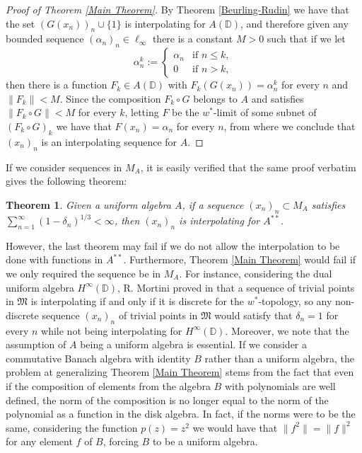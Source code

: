 \documentclass[preprint,12pt,number]{elsarticle}
\newtheorem{theorem}{Theorem}[section]
\newcommand{\D}{\mathbb{D}}
\begin{document}
\begin{proof}[Proof of Theorem \ref{Main Theorem}]
    By Theorem \ref{Beurling-Rudin} we have that the set $(G(x_n))_n\cup \{1\}$ is interpolating for $A(\D)$, and therefore given any bounded sequence $(\alpha_n)_n\in \ell_\infty$ there is a constant $M>0$ such that if we let 
    \[
    \alpha_n^k:=\left\{\begin{array}{cc}
       \alpha_n  & \text{if } n\leq k, \\
       0  & \text{if } n> k,
    \end{array}\right.
    \] 
    then there is a function $F_k\in A(\D)$ with $F_k(G(x_n))=\alpha_n^k$ for every $n$ and $\lVert F_k \rVert<M$. Since the composition $F_k\circ G$ belongs to $A$ and satisfies $\lVert F_k\circ G \rVert<M$ for every $k$, letting $F$ be the $w^*$-limit of some subnet of $(F_k\circ G)_k$ we have that $F(x_n)=\alpha_n$ for every $n$, from where we conclude that $(x_n)_n$ is an interpolating sequence for $A$.

\end{proof}



If we consider sequences in $M_A$, it is easily verified that the same proof verbatim gives the following theorem:
\begin{theorem}\label{Main-teo-bidual}
    Given a uniform algebra $A$, if a sequence $(x_n)_n\subset M_A$ satisfies $\sum_{n=1}^\infty(1-\delta_n)^{1/3}<\infty$, then $(x_n)_n$ is interpolating for $A^{**}$.
\end{theorem}

However, the last theorem may fail if we do not allow the interpolation to be done with functions in $A^{**}$. Furthermore, Theorem \ref{Main Theorem} would fail if we only required the sequence be in $M_A$. For instance, considering the dual uniform algebra $H^\infty(\D)$, R. Mortini proved in \cite{Mortini2000} that a sequence of trivial points in $\mathfrak{M}$ is interpolating if and only if it is discrete for the $w^*$-topology, so any non-discrete sequence $(x_n)_n$ of trivial points in $\mathfrak{M}$ would satisfy that $\delta_n=1$ for every $n$ while not being interpolating for $H^\infty(\D)$. Moreover,  we note that the assumption of $A$ being a uniform algebra is essential. If we consider a commutative Banach algebra with identity $B$ rather than a uniform algebra, the problem at generalizing Theorem \ref{Main Theorem} stems from the fact that even if the composition of elements from the algebra $B$ with polynomials are well defined,  the norm of the composition is  no longer equal to the norm of the polynomial as a function in the disk algebra. In fact, if the norms were to be the same, considering the function $p(z)=z^2$ we would have that $\lVert f^2 \rVert=\lVert f \rVert^2$ for any element $f$ of $B$, forcing $B$ to be a uniform algebra. 
\end{document}
